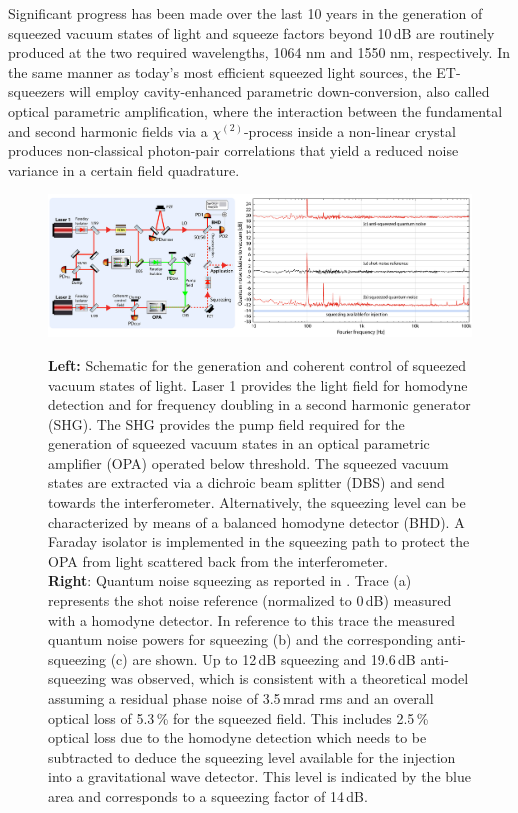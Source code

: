 Significant progress has been made over the last 10 years in the generation of squeezed vacuum states of light and squeeze factors beyond 10\,dB are routinely produced at the two required wavelengths, 1064 nm and 1550 nm, respectively.
%
In the same manner as today's most efficient squeezed light sources, the ET-squeezers will employ cavity-enhanced parametric down-conversion, also called optical parametric amplification, where the interaction between the fundamental and second harmonic fields via a $\chi^{(2)}$-process inside a non-linear crystal produces non-classical photon-pair correlations that yield a reduced noise variance in a certain field quadrature.  
%
%
%
\begin{figure} %
\centering
{\includegraphics[width=\linewidth]{Detector/DetFigures/SqueezerFig1b.pdf}}
\caption{{\bf{Left:}} Schematic for the generation and coherent control of squeezed vacuum states of light. Laser 1 provides the light field for homodyne detection and for frequency doubling in a second harmonic generator (SHG). The SHG provides the pump field required for the generation of squeezed vacuum states in an optical parametric amplifier (OPA) operated below threshold. The squeezed vacuum states are extracted via a dichroic beam splitter (DBS) and send towards the interferometer. Alternatively, the squeezing level can be characterized by means of a balanced homodyne detector (BHD).  A Faraday isolator is implemented in the squeezing path to protect the OPA from light scattered back from the interferometer.\\
{\bf{Right}}: Quantum noise squeezing as reported in \cite{Mehmet2018}. Trace (a) represents the shot noise reference (normalized to 0\,dB) measured with a homodyne detector. In reference to this trace the measured quantum noise powers for squeezing (b) and the corresponding anti-squeezing (c) are shown.
Up to 12\,dB squeezing and 19.6\,dB anti-squeezing was observed, which is consistent with a theoretical model assuming a residual phase noise of 3.5\,mrad rms and an overall optical loss of 5.3\,\% for the squeezed field. This includes 2.5\,\%  optical loss due to the homodyne detection which needs to be subtracted to deduce the squeezing level available for the injection into a gravitational wave detector. This level is indicated by the blue area and corresponds to a squeezing factor of 14\,dB.}
\label{SqueezerFig1}
\end{figure}
